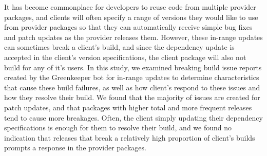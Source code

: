 It has become commonplace for developers to reuse code from multiple provider packages, and clients will often specify a range of versions they would like to use from provider packages so that they can automatically receive simple bug fixes and patch updates as the provider releases them. However, these in-range updates can sometimes break a client's build, and since the dependency update is accepted in the client's version specifications, the client package will also not build for any of it's users. In this study, we examined breaking build issue reports created by the Greenkeeper bot for in-range updates to determine characteristics that cause these build failures, as well as how client’s respond to these issues and how they resolve  their build. We found that the majority of issues are created for patch updates, and that packages with higher total and more frequent releases tend to cause more breakages. Often, the client simply updating their dependency specifications is enough for them to resolve their build, and we found no indication that releases that break a relatively high proportion of client's builds prompts a response in the provider packages.
